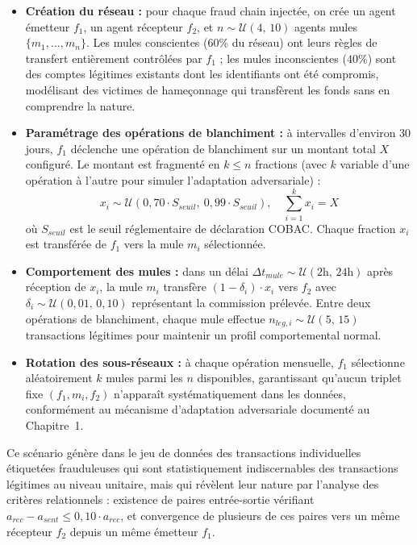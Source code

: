 \documentclass[11pt,a4paper,oneside]{report}
\theoremstyle{definition}
\theoremstyle{remark}
\begin{document}
\begin{itemize}
    \item \textbf{Création du réseau :} pour chaque fraud chain injectée, on crée un agent émetteur $f_1$, un agent récepteur $f_2$, et $n \sim \mathcal{U}(4,\, 10)$ agents mules $\{m_1, \ldots, m_n\}$. Les mules conscientes ($60\%$ du réseau) ont leurs règles de transfert entièrement contrôlées par $f_1$ ; les mules inconscientes ($40\%$) sont des comptes légitimes existants dont les identifiants ont été compromis, modélisant des victimes de hameçonnage qui transfèrent les fonds sans en comprendre la nature.

    \item \textbf{Paramétrage des opérations de blanchiment :} à intervalles d'environ 30 jours, $f_1$ déclenche une opération de blanchiment sur un montant total $X$ configuré. Le montant est fragmenté en $k \leq n$ fractions (avec $k$ variable d'une opération à l'autre pour simuler l'adaptation adversariale) :
    \begin{equation}
        x_i \sim \mathcal{U}(0{,}70 \cdot S_{seuil},\ 0{,}99 \cdot S_{seuil}), \quad \sum_{i=1}^{k} x_i = X
    \end{equation}
    où $S_{seuil}$ est le seuil réglementaire de déclaration COBAC. Chaque fraction $x_i$ est transférée de $f_1$ vers la mule $m_i$ sélectionnée.

    \item \textbf{Comportement des mules :} dans un délai $\Delta t_{mule} \sim \mathcal{U}(2\text{h},\, 24\text{h})$ après réception de $x_i$, la mule $m_i$ transfère $(1 - \delta_i) \cdot x_i$ vers $f_2$ avec $\delta_i \sim \mathcal{U}(0{,}01,\, 0{,}10)$ représentant la commission prélevée. Entre deux opérations de blanchiment, chaque mule effectue $n_{leg,i} \sim \mathcal{U}(5,\, 15)$ transactions légitimes pour maintenir un profil comportemental normal.

    \item \textbf{Rotation des sous-réseaux :} à chaque opération mensuelle, $f_1$ sélectionne aléatoirement $k$ mules parmi les $n$ disponibles, garantissant qu'aucun triplet fixe $(f_1, m_i, f_2)$ n'apparaît systématiquement dans les données, conformément au mécanisme d'adaptation adversariale documenté au Chapitre~1.
\end{itemize}

Ce scénario génère dans le jeu de données des transactions individuelles étiquetées frauduleuses qui sont statistiquement indiscernables des transactions légitimes au niveau unitaire, mais qui révèlent leur nature par l'analyse des critères relationnels : existence de paires entrée-sortie vérifiant $a_{rec} - a_{sent} \leq 0{,}10 \cdot a_{rec}$, et convergence de plusieurs de ces paires vers un même récepteur $f_2$ depuis un même émetteur $f_1$. 
\end{document}
